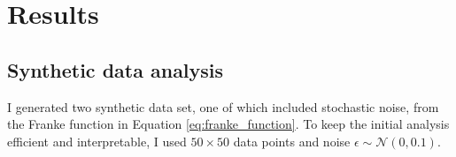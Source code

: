 \section{Results}\label{sec:results}
\subsection{Synthetic data analysis}\label{ssec:synthetic_data}
I generated two synthetic data set, one of which included stochastic noise, from the Franke function in Equation \eqref{eq:franke_function}. To keep the initial analysis efficient and interpretable, I used $50 \times 50$ data points and noise $\epsilon \sim \mathcal{N}(0, 0.1)$. 


